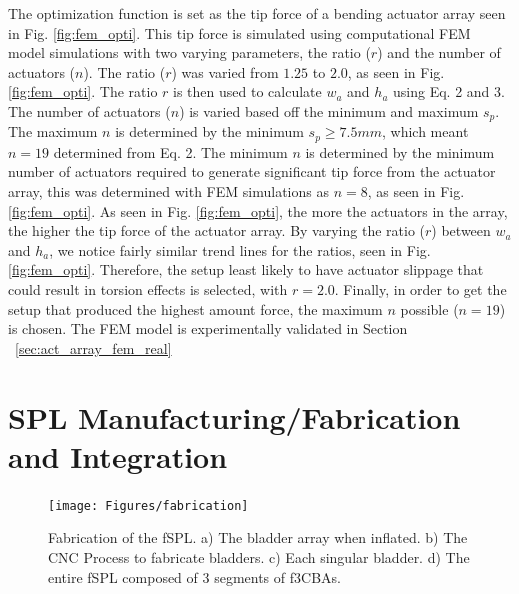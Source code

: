 \documentclass[letterpaper, 10 pt, conference]{ieeeconf}  %
\begin{document}
The optimization function is set as the tip force of a bending actuator array seen in Fig. \ref{fig:fem_opti}. This tip force is simulated using computational FEM model simulations with two varying parameters, the ratio ($r$) and the number of actuators ($n$). The ratio ($r$) was varied from $1.25$ to $2.0$, as seen in Fig. \ref{fig:fem_opti}. The ratio $r$ is then used to calculate $w_a$ and $h_a$ using Eq. 2 and 3. The number of actuators ($n$) is varied based off the minimum and maximum $s_p$. The maximum $n$ is determined by the minimum $s_p \geq 7.5mm$, which meant $n = 19$ determined from Eq. 2. The minimum $n$ is determined by the minimum number of actuators required to generate significant tip force from the actuator array, this was determined with FEM simulations as $n = 8$, as seen in Fig. \ref{fig:fem_opti}. As seen in Fig. \ref{fig:fem_opti}, the more the actuators in the array, the higher the tip force of the actuator array. By varying the ratio ($r$) between $w_a$ and $h_a$, we notice fairly similar trend lines for the ratios, seen in Fig. \ref{fig:fem_opti}. Therefore, the setup least likely to have actuator slippage that could result in torsion effects is selected, with $r =2.0$. Finally, in order to get the setup that produced the highest amount force, the maximum $n$ possible ($n = 19$) is chosen. The FEM model is experimentally validated in Section ~\ref{sec:act_array_fem_real}


\section{SPL Manufacturing/Fabrication and Integration}

\begin{figure}[t!]
\centering
\texttt{[image: Figures/fabrication]}
\caption{Fabrication of the fSPL. a) The bladder array when inflated. b) The CNC Process to fabricate bladders. c) Each singular bladder. d) The entire fSPL composed of 3 segments of f3CBAs.}
\label{fig:fabrication}
\vspace{-1.5em}
\end{figure}
\end{document}
